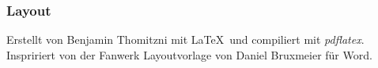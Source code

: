 \documentclass[12pt, a4paper, twoside, openany]{book}
\begin{document}
{        \subsection*{Layout}
        \begin{center}
               Erstellt von Benjamin Thomitzni mit \LaTeX~und compiliert mit \textit{pdflatex}.\\
               Inspririert von der Fanwerk Layoutvorlage von Daniel Bruxmeier für Word. \\         
        \end{center}
}
\chapter*{\MyTitle}%
\end{document}
